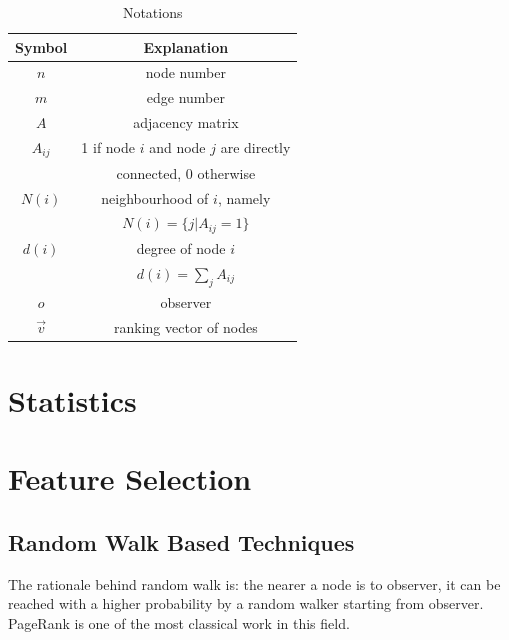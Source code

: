 \documentclass[11pt,a4paper]{article}
\begin{document}
\begin{table}[htb]
	\centering
	\caption{Notations}
	\label{tbl:notation}
	\begin{tabular}{c|c}
	\hline
	Symbol & Explanation \\
	\hline
	$n$ & node number \\
	$m$ & edge number \\
	$A$ & adjacency matrix \\
	$A_{ij}$ & 1 if node $i$ and node $j$ are directly \\
	& connected, 0 otherwise\\
	$N(i)$ & neighbourhood of $i$, namely \\
	& $N(i) = \{j | A_{ij} = 1 \}$ \\
	$d(i)$ & degree of node $i$ \\
	& $d(i) = \sum_{j}{A_{ij}}$ \\
	$o$ & observer \\
	$\overrightarrow{v}$ & ranking vector of nodes \\
	\hline
	\end{tabular}
\end{table}


\section{Statistics}

\section{Feature Selection}

\subsection{Random Walk Based Techniques}

The rationale behind random walk is: the nearer a node
is to observer, it can be reached with a higher probability by a random 
	walker starting from observer. PageRank is one of the most classical work 
	in this field.
\end{document}
